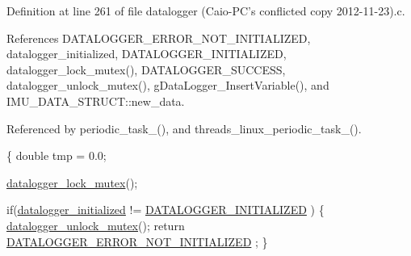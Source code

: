 Definition at line 261 of file datalogger (\-Caio-\/\-P\-C's conflicted copy 2012-\/11-\/23).\-c.



References D\-A\-T\-A\-L\-O\-G\-G\-E\-R\-\_\-\-E\-R\-R\-O\-R\-\_\-\-N\-O\-T\-\_\-\-I\-N\-I\-T\-I\-A\-L\-I\-Z\-E\-D, datalogger\-\_\-initialized, D\-A\-T\-A\-L\-O\-G\-G\-E\-R\-\_\-\-I\-N\-I\-T\-I\-A\-L\-I\-Z\-E\-D, datalogger\-\_\-lock\-\_\-mutex(), D\-A\-T\-A\-L\-O\-G\-G\-E\-R\-\_\-\-S\-U\-C\-C\-E\-S\-S, datalogger\-\_\-unlock\-\_\-mutex(), g\-Data\-Logger\-\_\-\-Insert\-Variable(), and I\-M\-U\-\_\-\-D\-A\-T\-A\-\_\-\-S\-T\-R\-U\-C\-T\-::new\-\_\-data.



Referenced by periodic\-\_\-task\-\_(), and threads\-\_\-linux\-\_\-periodic\-\_\-task\-\_().


\begin{DoxyCode}
\{
    \textcolor{keywordtype}{double} tmp = 0.0;

    \hyperlink{datalogger_01_07Caio-PC's_01conflicted_01copy_012012-11-23_08_8c_a54b06d9395b2e370a5a72beb7f9524b2}{datalogger\_lock\_mutex}();

    \textcolor{keywordflow}{if}(\hyperlink{datalogger_01_07Caio-PC's_01conflicted_01copy_012012-11-23_08_8c_a35e8fbe04b90452afdc3c1be16ff6187}{datalogger\_initialized} != \hyperlink{datalogger_01_07Caio-PC's_01conflicted_01copy_012012-11-23_08_8h_a684c343d340004b77ca2b782934c96ca}{DATALOGGER\_INITIALIZED}
      )
    \{
        \hyperlink{datalogger_01_07Caio-PC's_01conflicted_01copy_012012-11-23_08_8c_a85453211c0c809083c36cc56b275aeeb}{datalogger\_unlock\_mutex}();
        \textcolor{keywordflow}{return} \hyperlink{datalogger_01_07Caio-PC's_01conflicted_01copy_012012-11-23_08_8h_a60df7fe0e61b757ad6a9db106b0eb43e}{DATALOGGER\_ERROR\_NOT\_INITIALIZED}
      ;
    \}


\end{DoxyCode}
